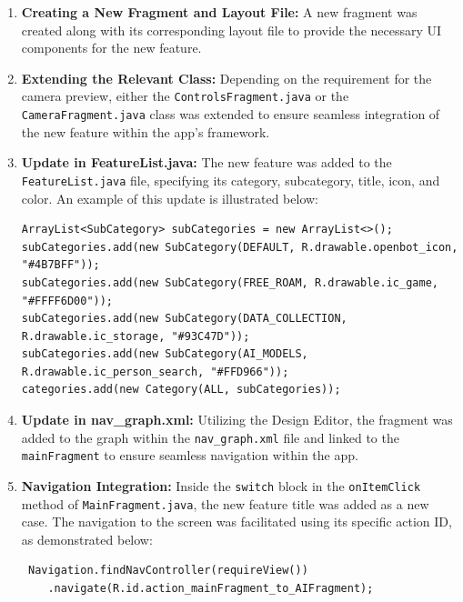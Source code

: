 \documentclass[12pt]{report}
\begin{document}
\begin{enumerate}
    \item \textbf{Creating a New Fragment and Layout File:} A new fragment was created along with its corresponding layout file to provide the necessary UI components for the new feature.

    \item \textbf{Extending the Relevant Class:} Depending on the requirement for the camera preview, either the \texttt{ControlsFragment.java} or the \texttt{CameraFragment.java} class was extended to ensure seamless integration of the new feature within the app's framework.

    \item \textbf{Update in FeatureList.java:} The new feature was added to the \texttt{FeatureList.java} file, specifying its category, subcategory, title, icon, and color. An example of this update is illustrated below:

    \begin{lstlisting}
ArrayList<SubCategory> subCategories = new ArrayList<>();
subCategories.add(new SubCategory(DEFAULT, R.drawable.openbot_icon, "#4B7BFF"));
subCategories.add(new SubCategory(FREE_ROAM, R.drawable.ic_game, "#FFFF6D00"));
subCategories.add(new SubCategory(DATA_COLLECTION, R.drawable.ic_storage, "#93C47D"));
subCategories.add(new SubCategory(AI_MODELS, R.drawable.ic_person_search, "#FFD966"));
categories.add(new Category(ALL, subCategories));
    \end{lstlisting}
   

  

    \item \textbf{Update in nav\_graph.xml:} Utilizing the Design Editor, the fragment was added to the graph within the \texttt{nav\_graph.xml} file and linked to the \texttt{mainFragment} to ensure seamless navigation within the app.

    \item \textbf{Navigation Integration:} Inside the \texttt{switch} block in the \texttt{onItemClick} method of \texttt{MainFragment.java}, the new feature title was added as a new case. The navigation to the screen was facilitated using its specific action ID, as demonstrated below:
    
  \begin{lstlisting}
 Navigation.findNavController(requireView())
    .navigate(R.id.action_mainFragment_to_AIFragment);     
  \end{lstlisting}

 
\end{enumerate}
\end{document}
